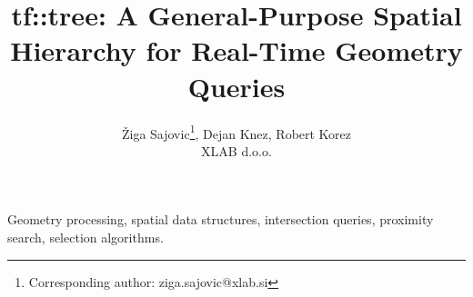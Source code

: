 


\title{tf::tree: A General-Purpose Spatial Hierarchy for Real-Time Geometry Queries}
\author{Žiga Sajovic\thanks{Corresponding author: ziga.sajovic@xlab.si}, Dejan Knez, Robert Korez\\ XLAB d.o.o.}
\date{}


\maketitle



\begin{IEEEkeywords}
Geometry processing, spatial data structures,
intersection queries, proximity search,
selection algorithms.
\end{IEEEkeywords}










